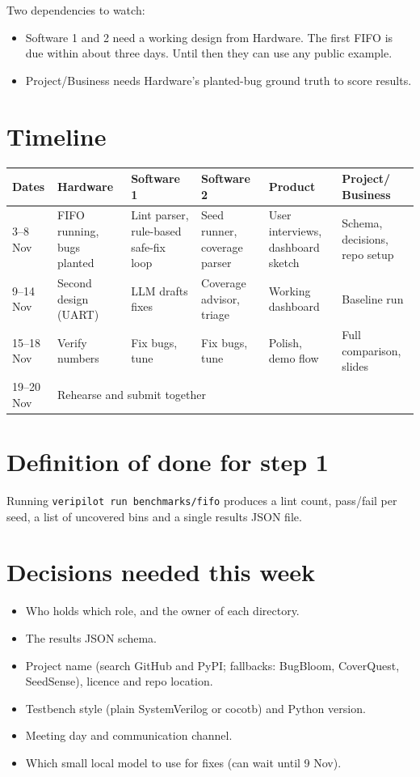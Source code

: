 \documentclass[11pt,a4paper]{article}
\begin{document}
Two dependencies to watch:
\begin{itemize}[nosep]
  \item Software 1 and 2 need a working design from Hardware. The first FIFO is due within about three days. Until then they can use any public example.
  \item Project/Business needs Hardware's planted-bug ground truth to score results.
\end{itemize}

\section{Timeline}
\begin{longtable}{p{1.9cm} p{2.5cm} p{2.5cm} p{2.5cm} p{2.5cm} p{2.5cm}}
\toprule
\textbf{Dates} & \textbf{Hardware} & \textbf{Software 1} & \textbf{Software 2} & \textbf{Product} & \textbf{Project/ Business} \\
\midrule
\endhead
3--8 Nov & FIFO running, bugs planted & Lint parser, rule-based safe-fix loop & Seed runner, coverage parser & User interviews, dashboard sketch & Schema, decisions, repo setup \\
9--14 Nov & Second design (UART) & LLM drafts fixes & Coverage advisor, triage & Working dashboard & Baseline run \\
15--18 Nov & Verify numbers & Fix bugs, tune & Fix bugs, tune & Polish, demo flow & Full comparison, slides \\
19--20 Nov & \multicolumn{5}{l}{Rehearse and submit together} \\
\bottomrule
\end{longtable}

\section{Definition of done for step 1}
Running \texttt{veripilot run benchmarks/fifo} produces a lint count, pass/fail per seed, a list of uncovered bins and a single results JSON file.

\section{Decisions needed this week}
\label{sec:decisions}
\begin{itemize}[nosep]
  \item Who holds which role, and the owner of each directory.
  \item The results JSON schema.
  \item Project name (search GitHub and PyPI; fallbacks: BugBloom, CoverQuest, SeedSense), licence and repo location.
  \item Testbench style (plain SystemVerilog or cocotb) and Python version.
  \item Meeting day and communication channel.
  \item Which small local model to use for fixes (can wait until 9 Nov).
\end{itemize}
\end{document}
